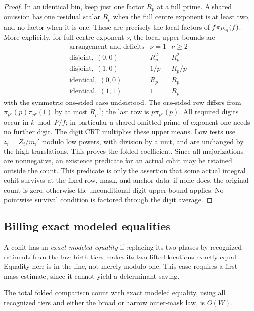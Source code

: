 \begin{proof}
In an identical bin, keep just one factor $R_p$ at a full prime. A shared
omission has one residual scalar $R_p$ when the full centre exponent is at
least two, and no factor when it is one. These are precisely the local
factors of $f\pi_{P_{\rm eq}}(f)$. More explicitly, for full centre
exponent $\nu$, the local upper bounds are
\[
\begin{array}{c|c|c}
 \text{arrangement and deficits}&\nu=1&\nu\ge2\\ \hline
 \text{disjoint},\ (0,0)&R_p^2&R_p^2\\
 \text{disjoint},\ (1,0)&1/p&R_p/p\\
 \text{identical},\ (0,0)&R_p&R_p\\
 \text{identical},\ (1,1)&1&R_p
\end{array}
\]
with the symmetric one-sided case understood. The one-sided row differs
from $\pi_{p^\nu}(p)\pi_{p^\nu}(1)$ by at most $R_p^{-1}$; the last
row is $p\pi_{p^\nu}(p)$. All required digits occur in
$k\bmod P/f$; in particular a shared omitted prime of exponent one needs
no further digit. The digit CRT multiplies these upper means. Low tests
use $z_i=Z_i/m_i'$ modulo low powers, with division by a unit, and are
unchanged by the high translations. This proves the folded coefficient.
Since all majorizations are nonnegative, an existence predicate for an
actual cohit may be retained outside the count. This predicate is only
the assertion that some actual integral cohit survives at the fixed
row, mask, and anchor data: if none does, the original count is zero;
otherwise the unconditional digit upper bound applies. No pointwise
survival condition is factored through the digit average.
\end{proof}

\subsection{Billing exact modeled equalities}

A cohit has an \emph{exact modeled equality} if replacing its two phases
by recognized rationals from the low birth tiers makes its two lifted
locations exactly equal. Equality here is in the line, not merely modulo
one. This case requires a first-mass estimate, since it cannot yield a
determinant saving.

\begin{lemma}\label{dir:exact-equalities}
The total folded comparison count with exact modeled equality, using all
recognized tiers and either the broad or narrow outer-mask law, is
$O(W)$.
\end{lemma}


